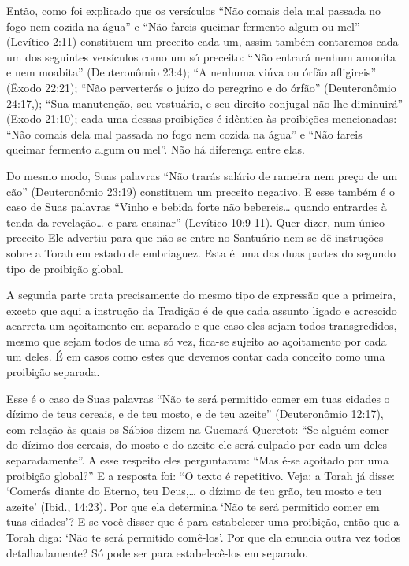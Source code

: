 Então, como foi explicado que os versículos ``Não comais dela mal
passada no fogo nem cozida na água'' e ``Não fareis queimar fermento
algum ou mel'' (Levítico 2:11) constituem um preceito cada um, assim
também contaremos cada um dos seguintes versículos como um só preceito:
``Não entrará nenhum amonita e nem moabita'' (Deuteronômio 23:4); ``A
nenhuma viúva ou órfão afligireis'' (Êxodo 22:21); ``Não perverterás o
juízo do peregrino e do órfão'' (Deuteronômio 24:17,); ``Sua
manutenção, seu vestuário, e seu direito conjugal não lhe diminuirá''
(Exodo 21:10); cada uma dessas proibições é idêntica às proibições
mencionadas: ``Não comais dela mal passada no fogo nem cozida na água''
e ``Não fareis queimar fermento algum ou mel''. Não há diferença entre
elas.

Do mesmo modo, Suas palavras ``Não trarás salário de rameira nem preço
de um cão'' (Deuteronômio 23:19) constituem um preceito negativo. E esse
também é o caso de Suas palavras ``Vinho e bebida forte não bebereis\ldots{}
quando entrardes à tenda da revelação\ldots{} e para ensinar'' (Levítico
10:9-11). Quer dizer, num único preceito Ele advertiu para que não se
entre no Santuário nem se dê instruções sobre a Torah em estado de
embriaguez. Esta é uma das duas partes do segundo tipo de proibição
global.

A segunda parte trata precisamente do mesmo tipo de expressão que a
primeira, exceto que aqui a instrução da Tradição é de que cada assunto
ligado e acrescido acarreta um açoitamento em separado e que caso eles
sejam todos transgredidos, mesmo que sejam todos de uma só vez, fica-se
sujeito ao açoitamento por cada um deles. É em casos como estes que
devemos contar cada conceito como uma proibição separada.



Esse é o caso de Suas palavras ``Não te será permitido comer em tuas
cidades o dízimo de teus cereais, e de teu mosto, e de teu azeite''
(Deuteronômio 12:17), com relação às quais os Sábios dizem na Guemará
Queretot: ``Se alguém comer do dízimo dos cereais, do mosto e do azeite
ele será culpado por cada um deles separadamente''. A esse respeito eles
perguntaram: ``Mas é-se açoitado por uma proibição global?'' E a
resposta foi: ``O texto é repetitivo. Veja: a Torah já disse: `Comerás
diante do Eterno, teu Deus,\ldots{} o dízimo de teu grão, teu mosto e teu
azeite' (Ibid., 14:23). Por que ela determina `Não te será permitido
comer em tuas cidades'? E se você disser que é para estabelecer uma
proibição, então que a Torah diga: `Não te será permitido comê-los'.
Por que ela enuncia outra vez todos detalhadamente? Só pode ser para
estabelecê-los em separado.

